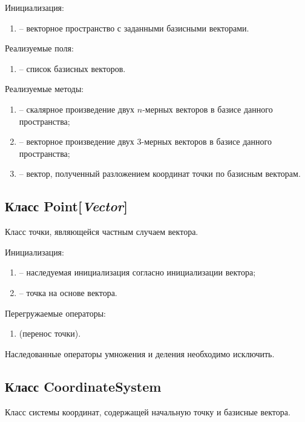 	\noindent Инициализация:
	\begin{enumerate}
		\item {} -- векторное пространство с заданными базисными векторами.
	\end{enumerate}

	\noindent Реализуемые поля:
	\begin{enumerate}
		\item {} -- список базисных векторов.
	\end{enumerate}

	\noindent Реализуемые методы:
	\begin{enumerate}
		\item {} -- скалярное произведение двух $n$-мерных векторов в базисе данного пространства;
		\item {} -- векторное произведение двух 3-мерных векторов в базисе данного пространства;
		\item {} -- вектор, полученный разложением координат точки по базисным векторам.
	\end{enumerate}


\subsection{Класс Point[\textit{Vector}]}
	\noindent Класс точки, являющейся частным случаем вектора. 

	\noindent Инициализация:
	\begin{enumerate}
		\item {} -- наследуемая инициализация согласно инициализации вектора;
		\item {} -- точка на основе вектора.
	\end{enumerate}

	\noindent Перегружаемые операторы:
	\begin{enumerate}
		\item {} (перенос точки).
	\end{enumerate}

	Наследованные операторы умножения и деления необходимо исключить.


\subsection{Класс CoordinateSystem}
	\noindent Класс системы координат, содержащей начальную точку и базисные вектора.

